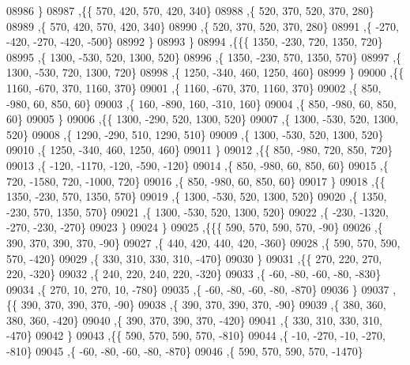 \begin{DoxyCode}
08986     \}
08987    ,\{\{   570,   420,   570,   420,   340\}
08988     ,\{   520,   370,   520,   370,   280\}
08989     ,\{   570,   420,   570,   420,   340\}
08990     ,\{   520,   370,   520,   370,   280\}
08991     ,\{  -270,  -420,  -270,  -420,  -500\}
08992     \}
08993    \}
08994   ,\{\{\{  1350,  -230,   720,  1350,   720\}
08995     ,\{  1300,  -530,   520,  1300,   520\}
08996     ,\{  1350,  -230,   570,  1350,   570\}
08997     ,\{  1300,  -530,   720,  1300,   720\}
08998     ,\{  1250,  -340,   460,  1250,   460\}
08999     \}
09000    ,\{\{  1160,  -670,   370,  1160,   370\}
09001     ,\{  1160,  -670,   370,  1160,   370\}
09002     ,\{   850,  -980,    60,   850,    60\}
09003     ,\{   160,  -890,   160,  -310,   160\}
09004     ,\{   850,  -980,    60,   850,    60\}
09005     \}
09006    ,\{\{  1300,  -290,   520,  1300,   520\}
09007     ,\{  1300,  -530,   520,  1300,   520\}
09008     ,\{  1290,  -290,   510,  1290,   510\}
09009     ,\{  1300,  -530,   520,  1300,   520\}
09010     ,\{  1250,  -340,   460,  1250,   460\}
09011     \}
09012    ,\{\{   850,  -980,   720,   850,   720\}
09013     ,\{  -120, -1170,  -120,  -590,  -120\}
09014     ,\{   850,  -980,    60,   850,    60\}
09015     ,\{   720, -1580,   720, -1000,   720\}
09016     ,\{   850,  -980,    60,   850,    60\}
09017     \}
09018    ,\{\{  1350,  -230,   570,  1350,   570\}
09019     ,\{  1300,  -530,   520,  1300,   520\}
09020     ,\{  1350,  -230,   570,  1350,   570\}
09021     ,\{  1300,  -530,   520,  1300,   520\}
09022     ,\{  -230, -1320,  -270,  -230,  -270\}
09023     \}
09024    \}
09025   ,\{\{\{   590,   570,   590,   570,   -90\}
09026     ,\{   390,   370,   390,   370,   -90\}
09027     ,\{   440,   420,   440,   420,  -360\}
09028     ,\{   590,   570,   590,   570,  -420\}
09029     ,\{   330,   310,   330,   310,  -470\}
09030     \}
09031    ,\{\{   270,   220,   270,   220,  -320\}
09032     ,\{   240,   220,   240,   220,  -320\}
09033     ,\{   -60,   -80,   -60,   -80,  -830\}
09034     ,\{   270,    10,   270,    10,  -780\}
09035     ,\{   -60,   -80,   -60,   -80,  -870\}
09036     \}
09037    ,\{\{   390,   370,   390,   370,   -90\}
09038     ,\{   390,   370,   390,   370,   -90\}
09039     ,\{   380,   360,   380,   360,  -420\}
09040     ,\{   390,   370,   390,   370,  -420\}
09041     ,\{   330,   310,   330,   310,  -470\}
09042     \}
09043    ,\{\{   590,   570,   590,   570,  -810\}
09044     ,\{   -10,  -270,   -10,  -270,  -810\}
09045     ,\{   -60,   -80,   -60,   -80,  -870\}
09046     ,\{   590,   570,   590,   570, -1470\}

\end{DoxyCode}
